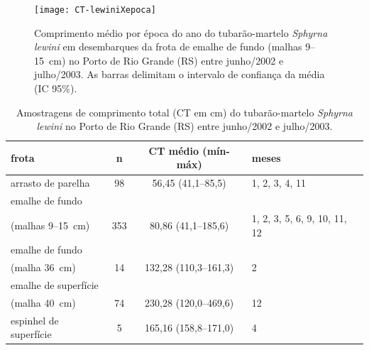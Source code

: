 \documentclass[a4paper,11pt,twoside,showtrims,onecolumn,openright,final]{memoir}
\begin{document}

%
%

\begin{figure}
\begin{center}
\texttt{[image: CT-lewiniXepoca]}
\end{center}
\caption[Comprimento médio por época do ano do tubarão-martelo \emph{Sphyrna lewini} no emalhe de fundo.]
        {Comprimento médio por época do ano do tubarão-martelo \emph{Sphyrna lewini} em desembarques da 
	 frota de emalhe de fundo (malhas 9--15~cm) no Porto de Rio Grande (RS) entre junho/2002 e julho/2003.
	 As barras delimitam o intervalo de confiança da média (IC 95\%).}
\label{fig:ctepoca-lewini}
\end{figure}



%
%


\begin{table}
\caption[Amostragens de comprimento total do tubarão-martelo \emph{Sphyrna lewini}]
        {Amostragens de comprimento total (CT em cm) do tubarão-martelo \emph{Sphyrna lewini} no 
         Porto de Rio Grande (RS) entre junho/2002 e julho/2003.}
\label{tab:ct-lewini}
\begin{center}
\begin{tabular*}{\textwidth}{l@{\extracolsep{\fill}}ccl}
\toprule
frota				& n		& CT médio (mín-máx)		& meses				\\
\midrule
arrasto de parelha		& 98		& 56,45 (41,1--85,5)		& 1, 2, 3, 4, 11		\\
emalhe de fundo			&		& 				&				\\
(malhas 9--15~cm)		& 353		& 80,86 (41,1--185,6)		& 1, 2, 3, 5, 6, 9, 10, 11, 12	\\
emalhe de fundo			& 		& 				&				\\
(malha 36~cm)			& 14		& 132,28 (110,3--161,3)		& 2				\\
emalhe de superfície		&		&				&				\\
(malha 40~cm)			& 74		& 230,28 (120,0--469,6)		& 12				\\
espinhel de superfície		& 5		& 165,16 (158,8--171,0)		& 4				\\
\bottomrule
\end{tabular*}
\end{center}
\end{table}
\end{document}
